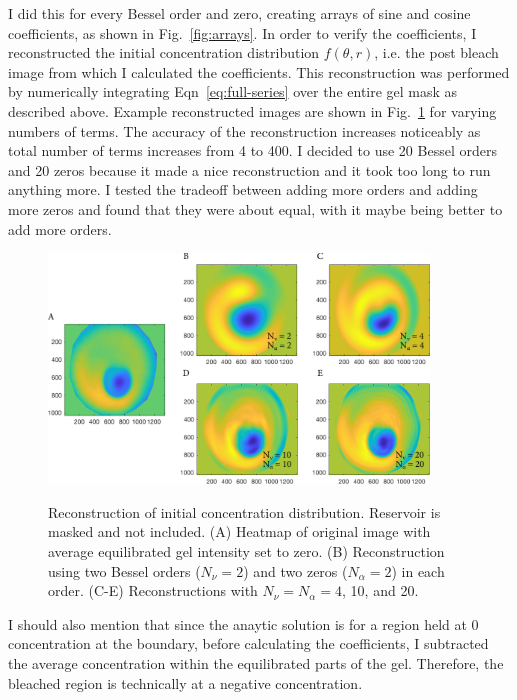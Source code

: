 I did this for every Bessel order and zero, creating arrays of sine and cosine coefficients, as shown in Fig.~\ref{fig:arrays}.  In order to verify the coefficients, I reconstructed the initial concentration distribution $f(\theta,r)$, i.e. the post bleach image from which I calculated the coefficients.  This reconstruction was performed by numerically integrating Eqn~\ref{eq:full-series} over the entire gel mask as described above.  Example reconstructed images are shown in Fig.~\ref{fig:initDist} for varying numbers of terms.  The accuracy of the reconstruction increases noticeably as total number of terms increases from 4 to 400.  I decided to use 20 Bessel orders and 20 zeros because it made a nice reconstruction and it took too long to run anything more.  I tested the tradeoff between adding more orders and adding more zeros and found that they were about equal, with it maybe being better to add more orders.

\begin{figure}
\caption{Reconstruction of initial concentration distribution. Reservoir is masked and not included.  (A) Heatmap of original image with average equilibrated gel intensity set to zero. (B) Reconstruction using two Bessel orders ($N_\nu = 2$) and two zeros ($N_\alpha = 2$) in each order. (C-E) Reconstructions with $N_\nu = N_\alpha = 4$, 10, and 20.}
\centering
\includegraphics[width=0.9\textwidth]{figs/ch04/reconstruction-16_2_4_10_20.pdf}
\label{fig:initDist}
\end{figure} 
I should also mention that since the anaytic solution is for a region held at 0 concentration at the boundary, before calculating the coefficients, I subtracted the average concentration within the equilibrated parts of the gel.  Therefore, the bleached region is technically at a negative concentration.

